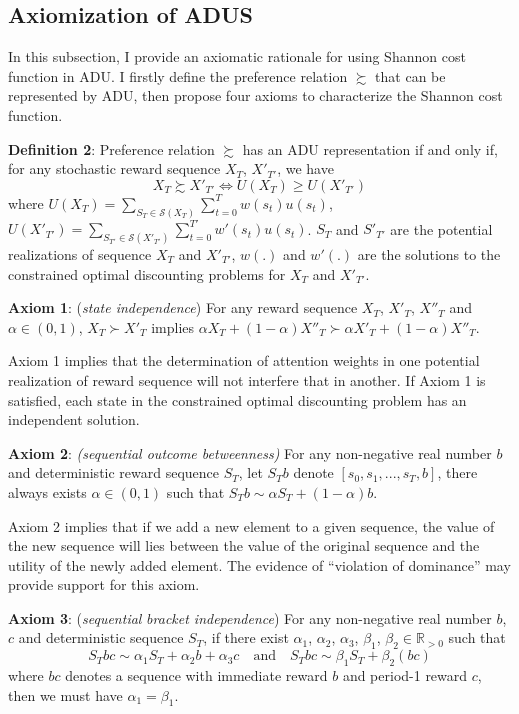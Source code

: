 \documentclass[
  12pt,
]{article}
\begin{document}
\hypertarget{axiomization-of-adus}{%
\subsection{\texorpdfstring{Axiomization of ADUS
\label{axiom}}{Axiomization of ADUS }}\label{axiomization-of-adus}}

In this subsection, I provide an axiomatic rationale for using Shannon
cost function in ADU. I firstly define the preference relation
\(\succsim\) that can be represented by ADU, then propose four axioms to
characterize the Shannon cost function.

\textbf{Definition 2}: Preference relation \(\succsim\) has an ADU
representation if and only if, for any stochastic reward sequence
\(X_T\), \(X'_{T'}\), we have \[
X_T \succsim X'_{T'} \Longleftrightarrow U(X_T)\geq U(X'_{T'})
\]where
\(U(X_T)=\sum_{S_T\in\mathcal{S}(X_T)}\sum_{t=0}^T w(s_t)u(s_t)\),
\(U(X'_{T'})=\sum_{S_{T'}\in\mathcal{S}(X'_{T'})}\sum_{t=0}^{T'}w'(s_t)u(s_t)\).
\(S_T\) and \(S'_{T'}\) are the potential realizations of sequence
\(X_T\) and \(X'_{T'}\), \(w(.)\) and \(w'(.)\) are the solutions to the
constrained optimal discounting problems for \(X_T\) and \(X'_{T'}\).

\textbf{Axiom 1}: (\emph{state independence}) For any reward sequence
\(X_T\), \(X'_T\), \(X''_T\) and \(\alpha\in(0,1)\), \(X_T\succ X'_T\)
implies
\(\alpha X_T+ (1-\alpha)X''_T \succ \alpha X'_T + (1-\alpha) X''_T\).

Axiom 1 implies that the determination of attention weights in one
potential realization of reward sequence will not interfere that in
another. If Axiom 1 is satisfied, each state in the constrained optimal
discounting problem has an independent solution.

\textbf{Axiom 2}: \emph{(sequential outcome betweenness)} For any
non-negative real number \(b\) and deterministic reward sequence
\(S_T\), let \(S_Tb\) denote \([s_0,s_1,...,s_T,b]\), there always
exists \(\alpha\in(0,1)\) such that \(S_Tb\sim \alpha S_T+(1-\alpha)b\).

Axiom 2 implies that if we add a new element to a given sequence, the
value of the new sequence will lies between the value of the original
sequence and the utility of the newly added element. The evidence of
``violation of dominance'' \citep{scholten_better_2014} may provide
support for this axiom.

\textbf{Axiom 3}: (\emph{sequential} \emph{bracket independence}) For
any non-negative real number \(b\), \(c\) and deterministic sequence
\(S_T\), if there exist \(\alpha_1\), \(\alpha_2\), \(\alpha_3\),
\(\beta_1\), \(\beta_2\in \mathbb{R}_{>0}\) such that
\[S_Tbc\sim \alpha_1S_T+\alpha_2b+\alpha_3c \quad\text{and}\quad S_Tbc\sim \beta_1S_T+\beta_2(bc)\]
where \(bc\) denotes a sequence with immediate reward \(b\) and period-1
reward \(c\), then we must have \(\alpha_1=\beta_1\).
\end{document}
